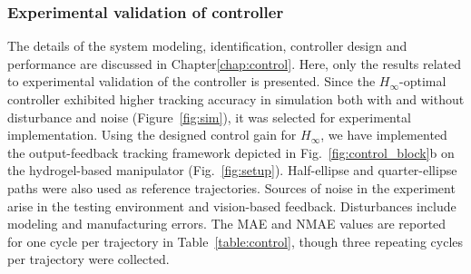 \subsubsection{Experimental validation of controller}
The details of the system modeling, identification, controller design and performance are discussed in Chapter\ref{chap:control}. Here, only the results related to experimental validation of the controller is presented. Since the $H_\infty$-optimal controller exhibited higher tracking accuracy in simulation both with and without disturbance and noise (Figure~\ref{fig:sim}), it was selected for experimental implementation. Using the designed control gain for $H_\infty$, we have implemented the output-feedback tracking framework depicted in Fig.~\ref{fig:control_block}b on the hydrogel-based manipulator (Fig.~\ref{fig:setup}). Half-ellipse and quarter-ellipse paths were also used as reference trajectories. Sources of noise in the experiment arise in the testing environment and vision-based feedback. Disturbances include modeling and manufacturing errors. The MAE and NMAE values are reported for one cycle per trajectory in Table~\ref{table:control}, though three repeating cycles per trajectory were collected.

